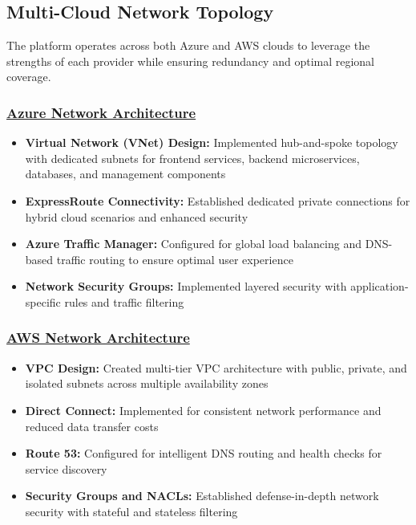 \subsection{Multi-Cloud Network Topology}
The platform operates across both Azure and AWS clouds to leverage the strengths of each provider while ensuring redundancy and optimal regional coverage.

\subsubsection*{\underline{Azure Network Architecture}}
\begin{itemize}
    \item \textbf{Virtual Network (VNet) Design:} Implemented hub-and-spoke topology with dedicated subnets for frontend services, backend microservices, databases, and management components
    \item \textbf{ExpressRoute Connectivity:} Established dedicated private connections for hybrid cloud scenarios and enhanced security
    \item \textbf{Azure Traffic Manager:} Configured for global load balancing and DNS-based traffic routing to ensure optimal user experience
    \item \textbf{Network Security Groups:} Implemented layered security with application-specific rules and traffic filtering
\end{itemize}

\subsubsection*{\underline{AWS Network Architecture}}
\begin{itemize}
    \item \textbf{VPC Design:} Created multi-tier VPC architecture with public, private, and isolated subnets across multiple availability zones
    \item \textbf{Direct Connect:} Implemented for consistent network performance and reduced data transfer costs
    \item \textbf{Route 53:} Configured for intelligent DNS routing and health checks for service discovery
    \item \textbf{Security Groups and NACLs:} Established defense-in-depth network security with stateful and stateless filtering
\end{itemize}

